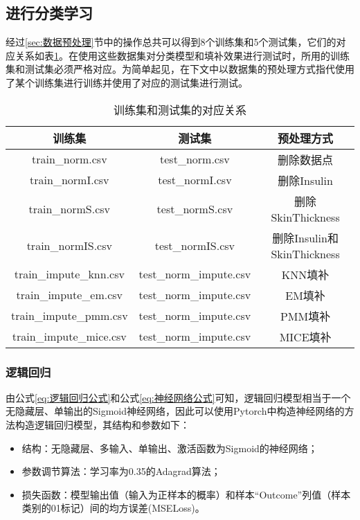 \documentclass[a4paper]{ctexart}
\begin{document}
\subsection{进行分类学习}
经过\ref{sec:数据预处理}节中的操作总共可以得到8个训练集和5个测试集，它们的对应关系如表\ref{tab:tt对应关系}。在使用这些数据集对分类模型和填补效果进行测试时，所用的训练集和测试集必须严格对应。为简单起见，在下文中以数据集的预处理方式指代使用了某个训练集进行训练并使用了对应的测试集进行测试。
\begin{table}[htbp]
	\centering
	\caption{训练集和测试集的对应关系}\label{tab:数据集表}
	\begin{tabular}{|c|c|c|}
		\hline
		训练集                  & 测试集                 & 预处理方式                 \\
		\hline
		train\_norm.csv         & test\_norm.csv         & 删除数据点                 \\
		\hline
		train\_normI.csv        & test\_normI.csv        & 删除Insulin                \\
		\hline
		train\_normS.csv        & test\_normS.csv        & 删除SkinThickness          \\
		\hline
		train\_normIS.csv       & test\_normIS.csv       & 删除Insulin和SkinThickness \\
		\hline
		train\_impute\_knn.csv  & test\_norm\_impute.csv & KNN填补                    \\
		\hline
		train\_impute\_em.csv   & test\_norm\_impute.csv & EM填补                     \\
		\hline
		train\_impute\_pmm.csv  & test\_norm\_impute.csv & PMM填补                    \\
		\hline
		train\_impute\_mice.csv & test\_norm\_impute.csv & MICE填补                   \\
		\hline
	\end{tabular}
	\label{tab:tt对应关系}
\end{table}

\subsubsection{逻辑回归}\label{sec:进行逻辑回归}
由公式\ref{eq:逻辑回归公式}和公式\ref{eq:神经网络公式}可知，逻辑回归模型相当于一个无隐藏层、单输出的Sigmoid神经网络，因此可以使用Pytorch中构造神经网络的方法构造逻辑回归模型，其结构和参数如下：
\begin{itemize}
	\item 结构：无隐藏层、多输入、单输出、激活函数为Sigmoid的神经网络；
	\item 参数调节算法：学习率为0.35的Adagrad算法；
	\item 损失函数：模型输出值（输入为正样本的概率）和样本“Outcome”列值（样本类别的01标记）间的均方误差(MSELoss)。
\end{itemize}
\end{document}
